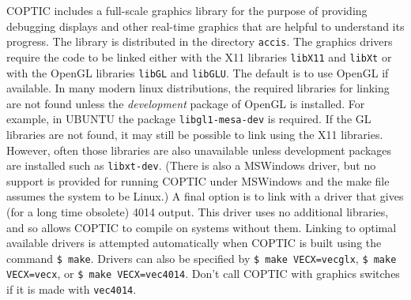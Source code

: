 \documentclass[12pt]{article}
\begin{document}
COPTIC includes a full-scale graphics library for the purpose of
providing debugging displays and other real-time graphics that are
helpful to understand its progress. The library is distributed in the
directory \verb!accis!. The graphics drivers require the code to be
linked either with the X11 libraries \verb!libX11! and \verb!libXt! or
with the OpenGL libraries \verb!libGL! and \verb!libGLU!. The default
is to use OpenGL if available. In many modern linux distributions, the
required libraries for linking are not found unless the
\emph{development} package of OpenGL is installed. For example, in
UBUNTU the package \verb!libgl1-mesa-dev!  is required. If the GL
libraries are not found, it may still be possible to link using the
X11 libraries. However, often those libraries are also unavailable
unless development packages are installed such as
\verb!libxt-dev!. (There is also a MSWindows driver, but no support is
provided for running COPTIC under MSWindows and the make file assumes
the system to be Linux.) A final option is to link with a driver that
gives (for a long time obsolete) 4014 output. This driver uses no additional
libraries, and so allows COPTIC to compile on systems without
them. Linking to optimal available drivers is attempted automatically
when COPTIC is built using the command \verb!$ make!.  Drivers can
also be specified by \verb!$ make VECX=vecglx!, \verb!$ make VECX=vecx!, or
\verb!$ make VECX=vec4014!. Don't call COPTIC with graphics switches
if it is made with \verb!vec4014!.
\end{document}
